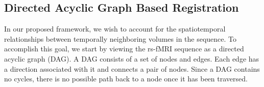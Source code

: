 



\subsection{Directed Acyclic Graph Based Registration}

In our proposed framework, we wish to account for the spatiotemporal relationships between temporally neighboring volumes in the sequence. To accomplish this goal, we start by viewing the rs-fMRI sequence as a directed acyclic graph (DAG). A DAG consists of a set of nodes and edges. Each edge has a direction associated with it and connects a pair of nodes. Since a DAG contains no cycles, there is no possible path back to a node once it has been traversed. 

